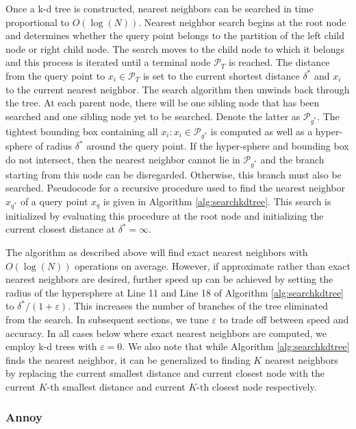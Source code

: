 \documentclass[11pt,a4paper,]{article}
\begin{document}
Once a k-d tree is constructed, nearest neighbors can be searched in time proportional to \(O(\log(N))\). Nearest neighbor search begins at the root node and determines whether the query point belongs to the partition of the left child node or right child node. The search moves to the child node to which it belongs and this process is iterated until a terminal node \(\mathcal{P}_T\) is reached. The distance from the query point to \(x_i\in\mathcal{P}_T\) is set to the current shortest distance \(\delta^*\) and \(x_i\) to the current nearest neighbor. The search algorithm then unwinds back through the tree. At each parent node, there will be one sibling node that has been searched and one sibling node yet to be searched. Denote the latter as \(\mathcal{P}_{g^*}\). The tightest bounding box containing all \(x_i:x_i\in\mathcal{P}_{g^*}\) is computed as well as a hyper-sphere of radius \(\delta^*\) around the query point. If the hyper-sphere and bounding box do not intersect, then the nearest neighbor cannot lie in \(\mathcal{P}_{g^*}\) and the branch starting from this node can be disregarded. Otherwise, this branch must also be searched. Pseudocode for a recursive procedure used to find the nearest neighbor \(x_{q^*}\) of a query point \(x_q\) is given in Algorithm \ref{alg:searchkdtree}. This search is initialized by evaluating this procedure at the root node and initializing the current closest distance at \(\delta^*=\infty\).

The algorithm as described above will find exact nearest neighbors with \(O(\log(N))\) operations on average. However, if approximate rather than exact nearest neighbors are desired, further speed up can be achieved by setting the radius of the hypersphere at Line 11 and Line 18 of Algorithm \ref{alg:searchkdtree} to \(\delta^*/(1+\varepsilon)\). This increases the number of branches of the tree eliminated from the search. In subsequent sections, we tune \(\varepsilon\) to trade off between speed and accuracy. In all cases below where exact nearest neighbors are computed, we employ k-d trees with \(\varepsilon=0\). We also note that while Algorithm \ref{alg:searchkdtree} finds the nearest neighbor, it can be generalized to finding \(K\) nearest neighbors by replacing the current smallest distance and current closest node with the current \(K\)-th smallest distance and current \(K\)-th closest node respectively.

\hypertarget{annoy}{%
\subsubsection*{Annoy}\label{annoy}}
\end{document}
